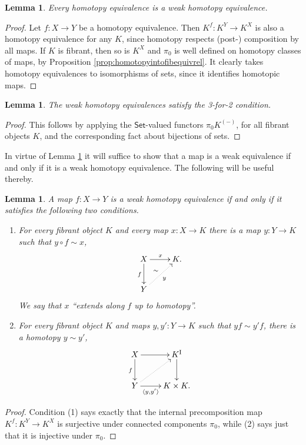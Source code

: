 \documentclass[11pt]{amsart}
\newcommand{\Set}{\ensuremath{\mathsf{Set}}}
\newcommand{\ra}{\ensuremath{\rightarrow}}
\newcommand{\I}{\ensuremath{\mathrm{I}}}
\newtheorem{lemma}[theorem]{Lemma}
\theoremstyle{remark}
\theoremstyle{definition}
\begin{document}
\begin{lemma}\label{lemma:HEisWHE}
Every homotopy equivalence is a weak homotopy equivalence.
\end{lemma}
\begin{proof}
Let $f: X\ra Y$ be a homotopy equivalence.  Then $K^f : K^Y \ra K^X$ is also a homotopy equivalence for any $K$, since homotopy respects (post-) composition by all maps.  If $K$ is fibrant, then so is $K^X$ and $\pi_0$ is well defined on homotopy classes of maps, by Proposition \ref{prop:homotopyintofibequivrel}.  It clearly takes homotopy equivalences to isomorphisms of sets, since it identifies homotopic maps.
\end{proof}

\begin{lemma}\label{lemma:WHE342}
The weak homotopy equivalences satisfy the 3-for-2 condition. 
\end{lemma}
\begin{proof}
This follows by applying the $\Set$-valued functors $\pi_0K^{(-)}$, for all fibrant objects $K$, and the corresponding fact about bijections of sets.
\end{proof}

In virtue of Lemma \ref{lemma:WHE342} it will suffice to show that a map is a weak equivalence if and only if it is a weak homotopy equivalence.   
The following will be useful thereby.

\begin{lemma}\label{lem:WHEunwound}
A map $f : X\ra Y$ is a \emph{weak homotopy equivalence} if and only if it satisfies the following two conditions.
\begin{enumerate}
\item For every fibrant object $K$ and every map $x : X \ra K$ there is a map $y:Y\ra K$ such that $y\circ f \sim x$,
\[
\xymatrix{
X \ar[d]_{f} \ar[r]^{x}  & K.\\
Y \ar@{..>}[ru]_{y}^{\sim} &
}
\]
We say that $x$ ``extends along $f$ up to homotopy''.
\item For every fibrant object $K$ and maps $y, y' : Y \ra K$ such that $yf \sim y'f$, there is a homotopy $y\sim y'$,
\[
\xymatrix{
X \ar[d]_{f} \ar[r]  & K^\I\ar[d] \\
Y \ar@{..>}[ru] \ar[r]_-{\langle y,y'\rangle} & K\times K.
}
\]
\end{enumerate}
\end{lemma}
\begin{proof}
Condition (1) says exactly that the internal precomposition map $K^f : K^Y \ra K^X$ is surjective under connected components $\pi_0$, while (2) says just that it is injective under $\pi_0$.
\end{proof}
\end{document}
